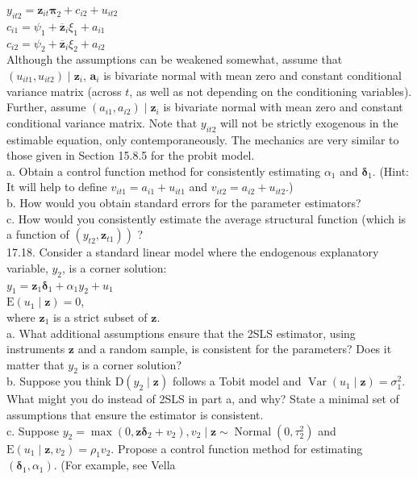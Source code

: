 \documentclass[10pt]{article}
\begin{document}
$y_{i t 2}=\mathbf{z}_{i t} \boldsymbol{\pi}_{2}+c_{i 2}+u_{i t 2}$\\
$c_{i 1}=\psi_{1}+\overline{\mathbf{z}}_{i} \xi_{1}+a_{i 1}$\\
$c_{i 2}=\psi_{2}+\overline{\mathbf{z}}_{i} \xi_{2}+a_{i 2}$\\
Although the assumptions can be weakened somewhat, assume that $\left(u_{i t 1}, u_{i t 2}\right) \mid \mathbf{z}_{i}$, $\mathbf{a}_{i}$ is bivariate normal with mean zero and constant conditional variance matrix (across $t$, as well as not depending on the conditioning variables). Further, assume $\left(a_{i 1}, a_{i 2}\right) \mid \mathbf{z}_{i}$ is bivariate normal with mean zero and constant conditional variance matrix. Note that $y_{i t 2}$ will not be strictly exogenous in the estimable equation, only contemporaneously. The mechanics are very similar to those given in Section 15.8.5 for the probit model.\\
a. Obtain a control function method for consistently estimating $\alpha_{1}$ and $\boldsymbol{\delta}_{1}$. (Hint: It will help to define $v_{i t 1}=a_{i 1}+u_{i t 1}$ and $v_{i t 2}=a_{i 2}+u_{i t 2}$.)\\
b. How would you obtain standard errors for the parameter estimators?\\
c. How would you consistently estimate the average structural function (which is a function of $\left.\left(y_{t 2}, \mathbf{z}_{t 1}\right)\right)$ ?\\
17.18. Consider a standard linear model where the endogenous explanatory variable, $y_{2}$, is a corner solution:\\
$y_{1}=\mathbf{z}_{1} \boldsymbol{\delta}_{1}+\alpha_{1} y_{2}+u_{1}$\\
$\mathrm{E}\left(u_{1} \mid \mathbf{z}\right)=0$,\\
where $\mathbf{z}_{1}$ is a strict subset of $\mathbf{z}$.\\
a. What additional assumptions ensure that the 2SLS estimator, using instruments $\mathbf{z}$ and a random sample, is consistent for the parameters? Does it matter that $y_{2}$ is a corner solution?\\
b. Suppose you think $\mathrm{D}\left(y_{2} \mid \mathbf{z}\right)$ follows a Tobit model and $\operatorname{Var}\left(u_{1} \mid \mathbf{z}\right)=\sigma_{1}^{2}$. What might you do instead of 2SLS in part a, and why? State a minimal set of assumptions that ensure the estimator is consistent.\\
c. Suppose $y_{2}=\max \left(0, \mathbf{z} \boldsymbol{\delta}_{2}+v_{2}\right), v_{2} \mid \mathbf{z} \sim \operatorname{Normal}\left(0, \tau_{2}^{2}\right)$ and $\mathrm{E}\left(u_{1} \mid \mathbf{z}, v_{2}\right)=\rho_{1} v_{2}$. Propose a control function method for estimating $\left(\boldsymbol{\delta}_{1}, \alpha_{1}\right)$. (For example, see Vella\\
\end{document}
